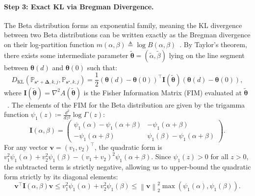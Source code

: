 \documentclass{article}
\def\vs{{\bm{s}}}
\def\vv{{\bm{v}}}
\def\sP{{\mathbb{P}}}
\newcommand{\KL}{D_{\mathrm{KL}}}
\theoremstyle{plain}
\theoremstyle{definition}
\theoremstyle{plain}
\newcommand{\bignorm}[1]{\left\lVert #1 \right\rVert}
\begin{document}
\paragraph{Step 3: Exact KL via Bregman Divergence.}
The Beta distribution forms an exponential family, meaning the KL divergence between two Beta distributions can be written exactly as the Bregman divergence on their log-partition function $m(\alpha, \beta) \triangleq \log B(\alpha, \beta)$~\citep{wainwright-jordan}.
By Taylor's theorem, there exists some intermediate parameter $\tilde{\bm\theta} = (\tilde{\alpha}, \tilde{\beta})$ lying on the line segment between $\bm\theta(d)$ and $\bm\theta(0)$ such that:
\begin{equation}
    \KL(\sP_{\vs^\star+\bm\Delta,k,j}, \sP_{\vs^\star,k,j}) = \frac{1}{2} (\bm\theta(d) - \bm\theta(0))^\top \bm{I}(\tilde{\bm\theta}) (\bm\theta(d) - \bm\theta(0)),
\end{equation}
where $\bm{I}(\tilde{\bm\theta}) = \nabla^2 A(\tilde{\bm\theta})$ is the Fisher Information Matrix (FIM) evaluated at $\tilde{\bm\theta}$~\citep{amari2016}.
The elements of the FIM for the Beta distribution are given by the trigamma function $\psi_1(z) \coloneq \frac{d^2}{dz^2} \log \Gamma(z)$:
\begin{equation}
    \bm{I}(\alpha, \beta) = \begin{pmatrix} \psi_1(\alpha) - \psi_1(\alpha+\beta) & -\psi_1(\alpha+\beta) \\ -\psi_1(\alpha+\beta) & \psi_1(\beta) - \psi_1(\alpha+\beta) \end{pmatrix}.
\end{equation}
For any vector $\vv = (v_1, v_2)^\top$, the quadratic form is $v_1^2 \psi_1(\alpha) + v_2^2 \psi_1(\beta) - (v_1+v_2)^2 \psi_1(\alpha+\beta)$. Since $\psi_1(z) > 0$ for all $z > 0$, the subtracted term is strictly negative, allowing us to upper-bound the quadratic form strictly by its diagonal elements:
\begin{equation}
    \vv^\top \bm{I}(\alpha, \beta) \vv \leq v_1^2 \psi_1(\alpha) + v_2^2 \psi_1(\beta) \leq \bignorm{\vv}_2^2 \max(\psi_1(\alpha), \psi_1(\beta)).
\end{equation}
\end{document}
